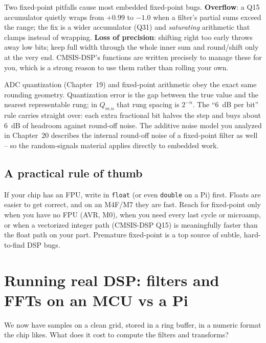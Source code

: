 \begin{trapbox}
Two fixed-point pitfalls cause most embedded fixed-point bugs. \textbf{Overflow}: a Q15 accumulator quietly
wraps from $+0.99$ to $-1.0$ when a filter's partial sums exceed the range; the fix is a wider
accumulator (Q31) and \emph{saturating} arithmetic that clamps instead of wrapping. \textbf{Loss
of precision}: shifting right too early throws away low bits; keep full width through the whole
inner sum and round/shift only at the very end. CMSIS-DSP's functions are written precisely to
manage these for you, which is a strong reason to use them rather than rolling your own.
\end{trapbox}

\begin{connectionbox}
ADC quantization (Chapter~19) and fixed-point arithmetic obey the exact same rounding geometry. Quantization
error is the gap between the true value and the nearest representable rung; in $Q_{m.n}$ that rung
spacing is $2^{-n}$. The ``6~dB per bit'' rule carries straight over: each extra fractional bit
halves the step and buys about 6~dB of headroom against round-off noise. The additive noise model you analyzed
in Chapter~20 describes the internal round-off noise of a fixed-point filter as well -- so the random-signals material applies directly to embedded work.
\end{connectionbox}

\subsection{A practical rule of thumb}

If your chip has an FPU, write in \texttt{float} (or even \texttt{double} on a Pi) first. Floats
are easier to get correct, and on an M4F/M7 they are fast. Reach for fixed-point only when you
have no FPU (AVR, M0), when you need every last cycle or microamp, or when a vectorized integer
path (CMSIS-DSP Q15) is meaningfully faster than the float path on your part. Premature fixed-point
is a top source of subtle, hard-to-find DSP bugs.

\section{Running real DSP: filters and FFTs on an MCU vs a Pi}
\label{ch40:running}

We now have samples on a clean grid, stored in a ring buffer, in a numeric format
the chip likes. What does it cost to compute the filters and transforms?

